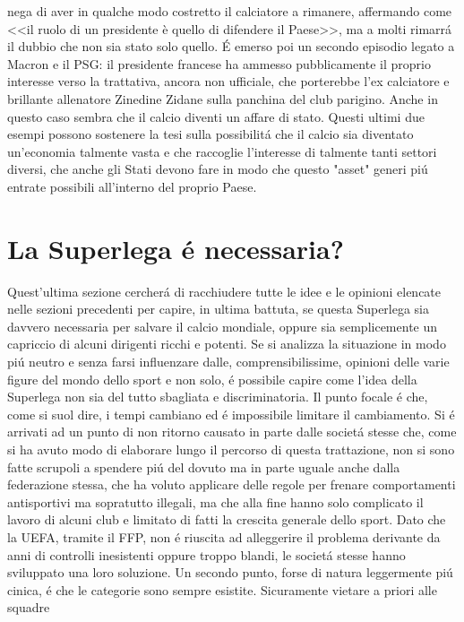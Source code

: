 \documentclass[
    corpo=12pt,
    oneside,
    evenboxes,
    tipotesi=triennale,
    stile=classica,
    oldstyle,
    autoretitolo,
    greek,
]{toptesi}
\begin{document}
\begin{interlinea}{1.5}
nega di aver in qualche modo costretto il calciatore a rimanere, affermando come <<il ruolo di un presidente è quello di difendere il Paese>>, ma 
a molti rimarr\'a il dubbio che non sia stato solo quello. \'E emerso poi un secondo episodio legato a Macron e il PSG: il presidente francese ha ammesso pubblicamente
il proprio interesse verso la trattativa, ancora non ufficiale, che porterebbe l'ex calciatore e brillante allenatore Zinedine Zidane sulla 
panchina del club parigino. Anche in questo caso sembra che il calcio diventi un affare di stato.
Questi ultimi due esempi possono sostenere la tesi sulla possibilit\'a che il calcio sia diventato un'economia talmente vasta e che raccoglie
l'interesse di talmente tanti settori diversi, che anche gli Stati devono fare in modo che questo "asset" generi pi\'u entrate possibili all'interno
del proprio Paese.
\section{La Superlega \'e necessaria?}
Quest'ultima sezione cercher\'a di racchiudere tutte le idee e le opinioni elencate nelle sezioni precedenti per capire, in ultima battuta,
se questa Superlega sia davvero necessaria per salvare il calcio mondiale, oppure sia semplicemente un capriccio di alcuni dirigenti
ricchi e potenti.\newline
Se si analizza la situazione in modo pi\'u neutro e senza farsi influenzare dalle, comprensibilissime, opinioni delle varie figure del mondo 
dello sport e non solo, \'e possibile capire come l'idea della Superlega non sia del tutto sbagliata e \linebreak discriminatoria.
Il punto focale \'e che, come si suol dire, i tempi cambiano ed \'e impossibile limitare il cambiamento. Si \'e arrivati ad un punto di non ritorno
causato in parte dalle societ\'a stesse che, come si ha avuto modo di elaborare lungo il percorso di questa trattazione, non si sono fatte scrupoli 
a spendere pi\'u del dovuto ma in parte uguale anche dalla federazione stessa, che ha voluto applicare delle regole per frenare comportamenti antisportivi 
ma sopratutto illegali, ma che alla fine hanno solo complicato il lavoro di alcuni club e limitato di fatti la crescita generale dello sport. Dato che la UEFA, tramite il FFP, non \'e riuscita
ad alleggerire il problema derivante da anni di controlli inesistenti oppure troppo blandi, le societ\'a stesse hanno sviluppato una loro soluzione.
Un secondo punto, forse di natura leggermente pi\'u cinica, \'e che le categorie sono sempre esistite. Sicuramente vietare a priori alle squadre

\end{interlinea}
\end{document}

